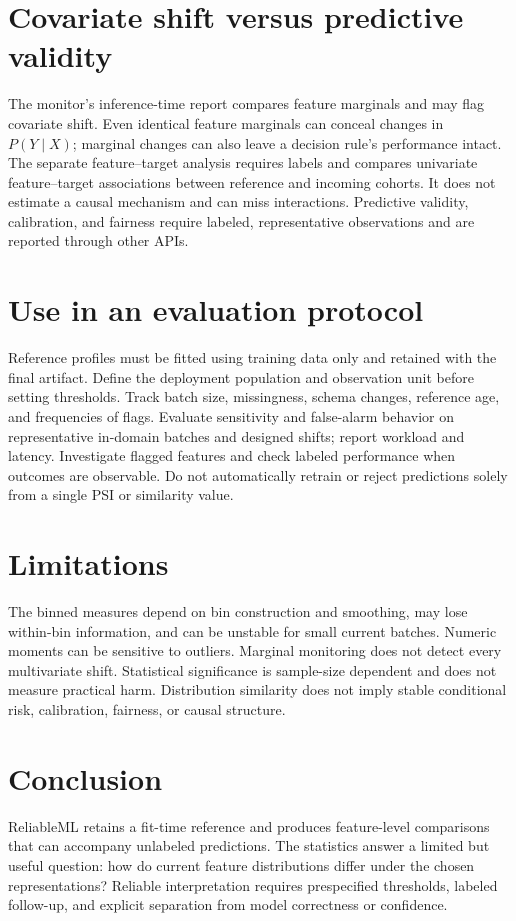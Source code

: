 \documentclass[conference]{IEEEtran}
\begin{document}
\section{Covariate shift versus predictive validity}
The monitor's inference-time report compares feature marginals and may flag covariate shift. Even identical feature marginals can conceal changes in \(P(Y\mid X)\); marginal changes can also leave a decision rule's performance intact. The separate feature--target analysis requires labels and compares univariate feature--target associations between reference and incoming cohorts. It does not estimate a causal mechanism and can miss interactions. Predictive validity, calibration, and fairness require labeled, representative observations and are reported through other APIs.

\section{Use in an evaluation protocol}
Reference profiles must be fitted using training data only and retained with the final artifact. Define the deployment population and observation unit before setting thresholds. Track batch size, missingness, schema changes, reference age, and frequencies of flags. Evaluate sensitivity and false-alarm behavior on representative in-domain batches and designed shifts; report workload and latency. Investigate flagged features and check labeled performance when outcomes are observable. Do not automatically retrain or reject predictions solely from a single PSI or similarity value.

\section{Limitations}
The binned measures depend on bin construction and smoothing, may lose within-bin information, and can be unstable for small current batches. Numeric moments can be sensitive to outliers. Marginal monitoring does not detect every multivariate shift. Statistical significance is sample-size dependent and does not measure practical harm. Distribution similarity does not imply stable conditional risk, calibration, fairness, or causal structure.

\section{Conclusion}
ReliableML retains a fit-time reference and produces feature-level comparisons that can accompany unlabeled predictions. The statistics answer a limited but useful question: how do current feature distributions differ under the chosen representations? Reliable interpretation requires prespecified thresholds, labeled follow-up, and explicit separation from model correctness or confidence.
\end{document}
